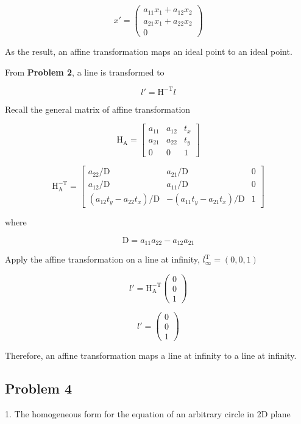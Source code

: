 \documentclass[conference]{IEEEtran}
\begin{document}
\[ x{'} = \begin{pmatrix} a_{11}x_1 + a_{12}x_2\\a_{21}x_1 + a_{22}x_2\\0 \end{pmatrix} \]

As the result, an affine transformation maps an ideal point to an ideal point.

From \textbf{Problem 2}, a line is transformed to 

\[l{'} = \mathrm{H}^\mathrm{-T}l \]

Recall the general matrix of affine transformation

\[ \mathrm{H}_\mathrm{A} = 
\begin{bmatrix}
a_{11} & a_{12} & t_{x}\\
a_{21} & a_{22} & t_{y}\\
0 & 0 & 1
\end{bmatrix}\]

\[ \mathrm{H}_\mathrm{A}^\mathrm{-T} = 
\begin{bmatrix}
a_{22}/\mathrm{D} & a_{21}/\mathrm{D} & 0\\
a_{12}/\mathrm{D} & a_{11}/\mathrm{D} & 0\\
(a_{12}t_y - a_{22}t_x)/\mathrm{D} & -(a_{11}t_y - a_{21}t_x)/\mathrm{D} & 1
\end{bmatrix}\]

where 

\[ \mathrm{D} = a_{11}a_{22} - a_{12}a_{21}\]

Apply the affine transformation on a line at infinity, \( l_{\infty}^\mathrm{T} = (0, 0, 1)\) 

\[l{'} = \mathrm{H}_\mathrm{A}^\mathrm{-T}\begin{pmatrix} 0\\0\\1 \end{pmatrix} \]

\[l{'} = \begin{pmatrix} 0\\0\\1 \end{pmatrix} \]

Therefore, an affine transformation maps a line at infinity to a line at infinity.

\clearpage
\subsection{Problem 4}

1. The homogeneous form for the equation of an arbitrary circle in 2D plane
\end{document}
